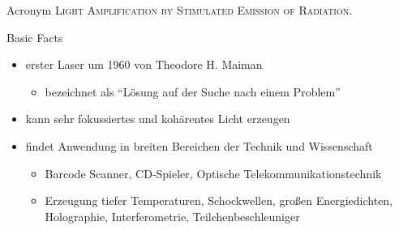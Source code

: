 \documentclass[10pt, aspectratio=169]{beamer}
\begin{document}
\begin{frame}
  \begin{block}{Acronym}
    \textsc{Light Amplification by Stimulated Emission of Radiation.}
  \end{block}

  \pause

  \begin{block}{Basic Facts}
    \begin{itemize}
    \item erster Laser um 1960 von Theodore H. Maiman
      \begin{itemize}
      \item bezeichnet als ``L\"osung auf der Suche nach einem
        Problem''~\cite{2010}
      \end{itemize}
    \item kann sehr fokussiertes und koh\"arentes Licht erzeugen
    \item findet Anwendung in breiten Bereichen der Technik und
      Wissenschaft
      \begin{itemize}
      \item Barcode Scanner, CD-Spieler, Optische
        Telekommunikationstechnik
      \item Erzeugung tiefer Temperaturen, Schockwellen, gro\ss{}en
        Energiedichten, Holographie, Interferometrie,
        Teilchenbeschleuniger
      \end{itemize}
    \end{itemize}
  \end{block}
\end{frame}
\end{document}
